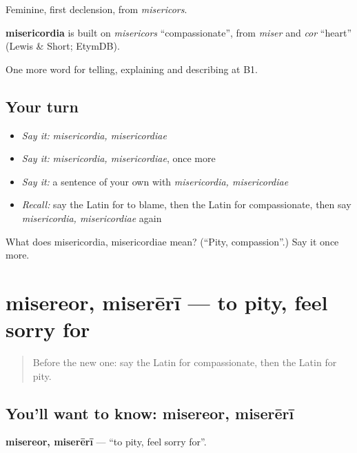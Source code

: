 Feminine, first declension, from \emph{misericors}.

\begin{cousinweb}
\textbf{misericordia} is built on \emph{misericors} \textquotedblleft{}compassionate\textquotedblright{}, from \emph{miser} and \emph{cor} \textquotedblleft{}heart\textquotedblright{} (Lewis \& Short; EtymDB).
\end{cousinweb}

\begin{grammarlens}[title={What you've built}]
One more word for telling, explaining and describing at B1.
\end{grammarlens}

\subsection*{Your turn}
\begin{itemize}
\raggedright
  \item \emph{Say it:} \emph{misericordia, misericordiae}
  \item \emph{Say it:} \emph{misericordia, misericordiae}, once more
  \item \emph{Say it:} a sentence of your own with \emph{misericordia, misericordiae}
  \item \emph{Recall:} say the Latin for to blame, then the Latin for compassionate, then say \emph{misericordia, misericordiae} again
\end{itemize}

\begin{tcolorbox}[breakable,colback=teal!4,colframe=teal!35!black,title={Before you move on}]
What does misericordia, misericordiae mean? (\textquotedblleft{}Pity, compassion\textquotedblright{}.) Say it once more.
\end{tcolorbox}
\section[misereor, miserērī]{misereor, miserērī — to pity, feel sorry for}

\label{lesson:LA-C513-misereor}



\begin{quote}
Before the new one: say the Latin for compassionate, then the Latin for pity.
\end{quote}

\subsection*{You'll want to know: misereor, miserērī}
\textbf{misereor, miserērī} — \textquotedblleft{}to pity, feel sorry for\textquotedblright{}.

